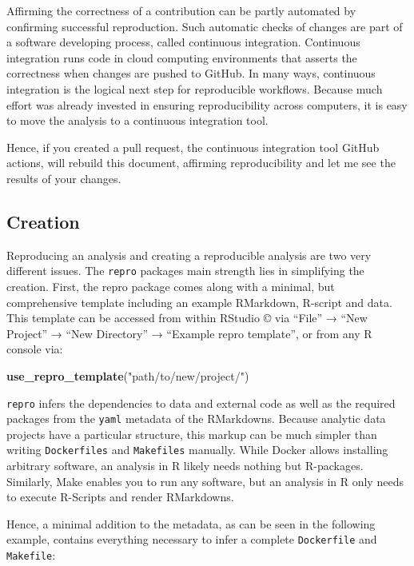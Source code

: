 \documentclass[12pt,a4paper,twoside]{article}
\newenvironment{Shaded}{\begin{snugshade}}{\end{snugshade}}
\newcommand{\KeywordTok}[1]{\textcolor[rgb]{0.13,0.29,0.53}{\textbf{#1}}}
\newcommand{\NormalTok}[1]{#1}
\newcommand{\StringTok}[1]{\textcolor[rgb]{0.31,0.60,0.02}{#1}}
\begin{document}
Affirming the correctness of a contribution can be partly automated by confirming successful reproduction.
Such automatic checks of changes are part of a software developing process, called continuous integration.
Continuous integration runs code in cloud computing environments that asserts the correctness when changes are pushed to GitHub.
In many ways, continuous integration is the logical next step for reproducible workflows.
Because much effort was already invested in ensuring reproducibility across computers, it is easy to move the analysis to a continuous integration tool.

Hence, if you created a pull request, the continuous integration tool GitHub actions, will rebuild this document, affirming reproducibility and let me see the results of your changes.

\hypertarget{creation}{%
\subsection{Creation}\label{creation}}

Reproducing an analysis and creating a reproducible analysis are two very different issues.
The \texttt{repro} packages main strength lies in simplifying the creation.
First, the repro package comes along with a minimal, but comprehensive template including an example RMarkdown, R-script and data.
This template can be accessed from within RStudio © via ``File'' → ``New Project'' → ``New Directory'' → ``Example repro template'', or from any R console via:

\begin{Shaded}
\begin{Highlighting}[]
\KeywordTok{use_repro_template}\NormalTok{(}\StringTok{"path/to/new/project/"}\NormalTok{)}
\end{Highlighting}
\end{Shaded}

\texttt{repro} infers the dependencies to data and external code as well as the required packages from the \texttt{yaml} metadata of the RMarkdowns.
Because analytic data projects have a particular structure, this markup can be much simpler than writing \texttt{Dockerfiles} and \texttt{Makefiles} manually.
While Docker allows installing arbitrary software, an analysis in R likely needs nothing but R-packages. Similarly, Make enables you to run any software, but an analysis in R only needs to execute R-Scripts and render RMarkdowns.

Hence, a minimal addition to the metadata, as can be seen in the following example, contains everything necessary to infer a complete \texttt{Dockerfile} and \texttt{Makefile}:
\end{document}
